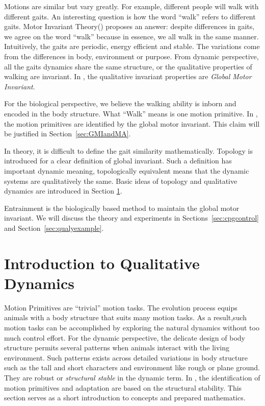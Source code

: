 Motions are similar but vary greatly.
For example, different people will walk with different gaits. 
An interesting question  is how the word ``walk'' refers to different gaits.
Motor Invariant Theory(\moit) proposes an answer:  despite differences in gaits, we agree on the word ``walk''  because in essence, we all walk in the same manner.
Intuitively, the gaits are periodic, energy efficient and stable.
The variations come from the differences in body, environment or purpose.
From dynamic perspective, all the gaits dynamics share the same structure, or the qualitative properties of walking are invariant.
In \moit, the qualitative invariant properties are \emph{Global Motor Invariant}.


For the biological perspective, we believe the walking ability is inborn and encoded in the body structure.
What ``Walk'' means is one motion primitive.
In \moit, the motion primitives are identified by the global motor invariant.
This claim will be justified in Section~\ref{sec:GMIandMA}.


In theory, it is difficult to define the gait similarity mathematically.
Topology is introduced for a clear definition of global invariant.
Such a definition has important dynamic meaning, topologically equivalent means that the dynamic systems are qualitatively the same.
Basic ideas of topology and qualitative dynamics are introduced in Section \ref{sec:qualiDy}.

Entrainment is the biologically based method to maintain the global motor invariant.
We will discuss the theory and experiments in Sections~\ref{sec:cpgcontrol} and Section~\ref{sec:qualyexample}.







\section{Introduction to Qualitative Dynamics}
\label{sec:qualiDy}
Motion Primitives are ``trivial'' motion tasks.
The evolution process equips animals with a body structure that suits many motion tasks.
As a result,such motion tasks can be accomplished by exploring the natural dynamics without too much control effort.
For the dynamic perspective, the delicate design of body structure permits several patterns when animals interact with the living environment.  
Such patterns exists across detailed variations in body structure such as the tall and short characters and environment like rough or plane ground.
They are robust or \emph{structural stable} in the dynamic term.
In \moit, the identification of motion primitives and adaptation are based on the structural stability.
This section serves as a short introduction to concepts and prepared mathematics.



